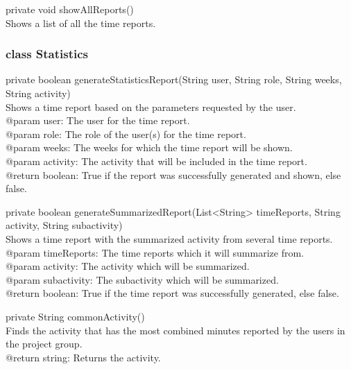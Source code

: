 \documentclass[a4paper]{article}
\begin{document}
\vspace{5mm}
\begin{hangparas}{1.5em}{1}
private void showAllReports()\\
Shows a list of all the time reports.\\
\end{hangparas}


\subsubsection{class Statistics}

\begin{hangparas}{1.5em}{1}
private boolean generateStatisticsReport(String user, String role, String weeks, String activity)\\
Shows a time report based on the parameters requested by the user.\\
@param user: The user for the time report.\\
@param role: The role of the user(s) for the time report.\\
@param weeks: The weeks for which the time report will be shown.\\
@param activity: The activity that will be included in the time report.\\
@return boolean: True if the report was successfully generated and shown, else false.
\end{hangparas}

\vspace{5mm}
\begin{hangparas}{1.5em}{1}
private boolean generateSummarizedReport(List<String> timeReports, String activity, String subactivity)\\
Shows a time report with the summarized activity from several time reports.\\
@param timeReports: The time reports which it will summarize from.\\
@param activity: The activity which will be summarized.\\
@param subactivity: The subactivity which will be summarized.\\
@return boolean: True if the time report was successfully generated, else false.
\end{hangparas}

\vspace{5mm}
\begin{hangparas}{1.5em}{1}
private String commonActivity()\\
Finds the activity that has the most combined minutes reported by the users in the project group.\\
@return string: Returns the activity.
\end{hangparas}
\end{document}
